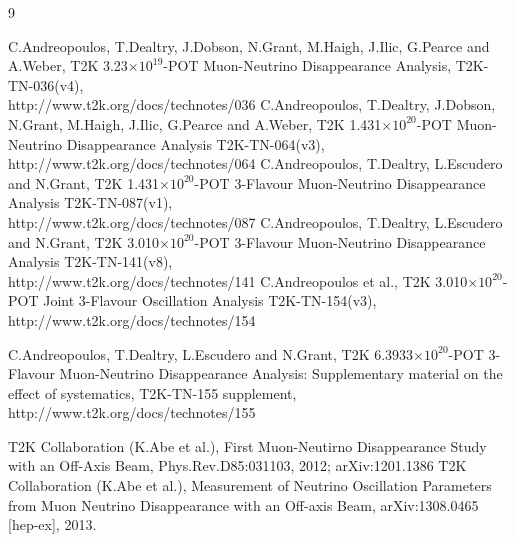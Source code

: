 %
%

\begin{thebibliography}{9}

%
%
   C.Andreopoulos, T.Dealtry, J.Dobson, N.Grant, M.Haigh, J.Ilic, G.Pearce and A.Weber,
   T2K 3.23$\times10^{19}$-POT Muon-Neutrino Disappearance Analysis,
   T2K-TN-036(v4),\\
   http://www.t2k.org/docs/technotes/036
   C.Andreopoulos, T.Dealtry, J.Dobson, N.Grant, M.Haigh, J.Ilic, G.Pearce and A.Weber,
   T2K 1.431$\times10^{20}$-POT Muon-Neutrino Disappearance Analysis
   T2K-TN-064(v3),\\
   http://www.t2k.org/docs/technotes/064
   C.Andreopoulos, T.Dealtry, L.Escudero and N.Grant,
   T2K 1.431$\times10^{20}$-POT 3-Flavour Muon-Neutrino Disappearance Analysis
   T2K-TN-087(v1),\\
   http://www.t2k.org/docs/technotes/087
   C.Andreopoulos, T.Dealtry, L.Escudero and N.Grant,
   T2K 3.010$\times10^{20}$-POT 3-Flavour Muon-Neutrino Disappearance Analysis
   T2K-TN-141(v8),\\
   http://www.t2k.org/docs/technotes/141
   C.Andreopoulos et al.,
   T2K 3.010$\times10^{20}$-POT Joint 3-Flavour Oscillation Analysis
   T2K-TN-154(v3),\\
   http://www.t2k.org/docs/technotes/154

%
%
  C.Andreopoulos, T.Dealtry, L.Escudero and N.Grant,
  T2K 6.3933$\times10^{20}$-POT 3-Flavour Muon-Neutrino Disappearance Analysis:
  Supplementary material on the effect of systematics,
  T2K-TN-155 supplement,\\
  http://www.t2k.org/docs/technotes/155

%
%
   T2K Collaboration (K.Abe et al.), 
   First Muon-Neutirno Disappearance Study with an Off-Axis Beam,
   Phys.Rev.D85:031103, 2012; arXiv:1201.1386
  T2K Collaboration (K.Abe et al.),
  Measurement of Neutrino Oscillation Parameters from Muon Neutrino Disappearance with an Off-axis Beam,
  arXiv:1308.0465 [hep-ex], 2013.
  

\end{thebibliography}
